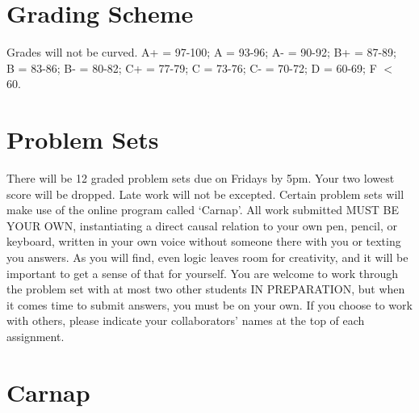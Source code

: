 \documentclass[letterpaper]{inzane_syllabus} %
\begin{document}
\section{Grading Scheme}

\begin{twentyshort}
\end{twentyshort}

Grades will not be curved.
A+ = 97-100; A = 93-96; A- = 90-92; B+ = 87-89;\\ 
B = 83-86; B- = 80-82; C+ = 77-79; C = 73-76; C- = 70-72; D = 60-69; F $<$ 60.


\vspace{0.5cm}
\section{Problem Sets}

There will be 12 graded problem sets due on Fridays by 5pm.
Your two lowest score will be dropped.
Late work will not be excepted.
Certain problem sets will make use of the online program called `Carnap'.
All work submitted MUST BE YOUR OWN, instantiating a direct causal relation to your own pen, pencil, or keyboard, written in your own voice without someone there with you or texting you answers.
As you will find, even logic leaves room for creativity, and it will be important to get a sense of that for yourself.
You are welcome to work through the problem set with at most two other students IN PREPARATION, but when it comes time to submit answers, you must be on your own.
If you choose to work with others, please indicate your collaborators' names at the top of each assignment.

\vspace{0.5cm}
\section{Carnap}
\end{document}
